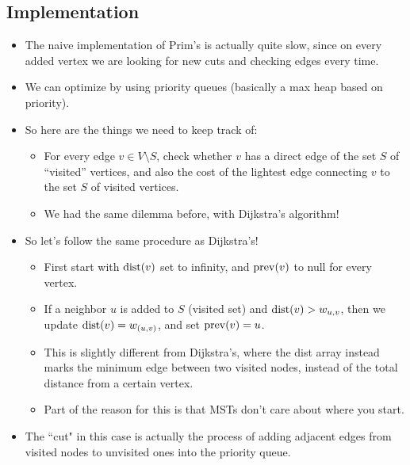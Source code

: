 	\subsection{Implementation}
	\begin{itemize}
		\item The naive implementation of Prim's is actually quite slow, since on every added vertex we 
			are looking for new cuts and checking edges every time.
		\item We can optimize by using priority queues (basically a max heap based on priority).  

		\item So here are the things we need to keep track of:
			\begin{itemize}
				\item For every edge $v \in V \setminus S$, check whether $v$ has a direct 
					edge of the set $S$ of ``visited'' vertices, and also the cost of the lightest 
					edge connecting
					$v$ to the set $S$ of visited vertices.
				\item We had the same dilemma before, with Dijkstra's algorithm!
			\end{itemize}
		\item So let's follow the same procedure as Dijkstra's!
			\begin{itemize}
				\item First start with $\mathrm{dist}(v)$ set to infinity, and $\mathrm{prev}(v)$ to null for 
					every vertex.
				\item If a neighbor $u$ is added to $S$ (visited set) and $\mathrm{dist}(v) > w_{u, v}$, then 
					we update $\mathrm{dist}(v) = w_{(u, v)}$, and set $\mathrm{prev}(v) = u$. 
				\item This is slightly different from Dijkstra's, where the dist array instead marks 
					the minimum edge between two visited nodes, instead of the total distance 
					from a certain vertex. 
				\item Part of the reason for this is that MSTs don't care about where you start. 
			\end{itemize}
		\item The ``cut" in this case is actually the process of adding adjacent edges from visited nodes
			to unvisited ones into the priority queue. 
	\end{itemize}
